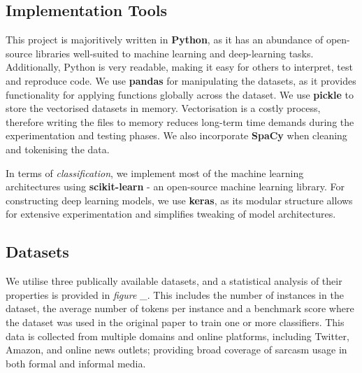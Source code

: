 \documentclass[12pt,a4paper]{article}
\begin{document}
\subsection{Implementation Tools}
\noindent This project is majoritively written in \textbf{Python}, as it has an abundance of open-source libraries well-suited to machine learning and deep-learning tasks. Additionally, Python is very readable, making it easy for others to interpret, test and reproduce code. We use \textbf{pandas} for manipulating the datasets, as it provides functionality for applying functions globally across the dataset. We use \textbf{pickle} to store the vectorised datasets in memory. Vectorisation is a costly process, therefore writing the files to memory reduces long-term time demands during the experimentation and testing phases. We also  incorporate \textbf{SpaCy} when cleaning and tokenising the data.

In terms of \textit{classification}, we implement most of the machine learning architectures using \textbf{scikit-learn} - an open-source machine learning library. For constructing deep learning models, we use \textbf{keras}, as its modular structure allows for extensive experimentation and simplifies tweaking of model architectures.
\newpage
\subsection{Datasets}
\vspace{-4.2pt}\noindent We utilise three publically available datasets, and a statistical analysis of their properties is provided in \textit{figure \_}. This includes the number of instances in the dataset, the average number of tokens per instance and a benchmark score where the dataset was used in the original paper to train one or more classifiers. This data is collected from multiple domains and online platforms, including Twitter, Amazon, and online news outlets; providing broad coverage of sarcasm usage in both formal and informal media. \vspace{-4.2pt}
\end{document}
